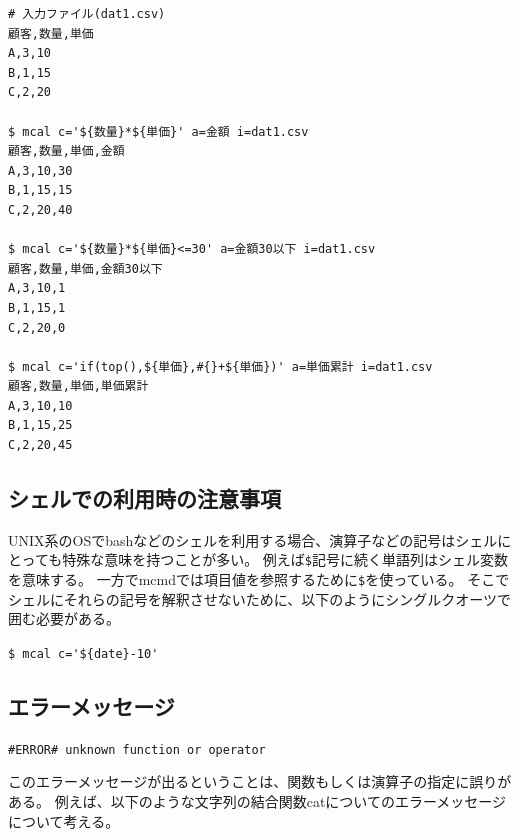 \begin{Verbatim}[baselinestretch=0.7,frame=single,fontsize=\small]
# 入力ファイル(dat1.csv)
顧客,数量,単価
A,3,10
B,1,15
C,2,20

$ mcal c='${数量}*${単価}' a=金額 i=dat1.csv
顧客,数量,単価,金額
A,3,10,30
B,1,15,15
C,2,20,40

$ mcal c='${数量}*${単価}<=30' a=金額30以下 i=dat1.csv
顧客,数量,単価,金額30以下
A,3,10,1
B,1,15,1
C,2,20,0

$ mcal c='if(top(),${単価},#{}+${単価})' a=単価累計 i=dat1.csv
顧客,数量,単価,単価累計
A,3,10,10
B,1,15,25
C,2,20,45
\end{Verbatim}



\subsection*{シェルでの利用時の注意事項}
UNIX系のOSでbashなどのシェルを利用する場合、演算子などの記号はシェルにとっても特殊な意味を持つことが多い。
例えば\verb|$|記号に続く単語列はシェル変数を意味する。
一方でmcmdでは項目値を参照するために\verb|$|を使っている。
そこでシェルにそれらの記号を解釈させないために、以下のようにシングルクオーツで囲む必要がある。

\verb|$ mcal c='${date}-10'|

\subsection*{エラーメッセージ}

\verb|#ERROR# unknown function or operator|

このエラーメッセージが出るということは、関数もしくは演算子の指定に誤りがある。
例えば、以下のような文字列の結合関数catについてのエラーメッセージについて考える。

